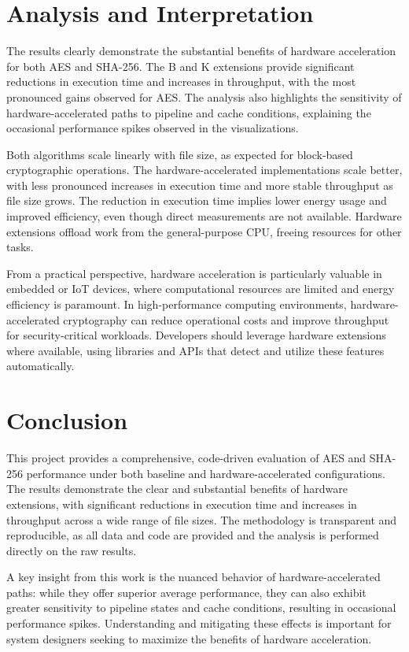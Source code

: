 \documentclass[12pt,a4paper]{article}
\begin{document}
\section{Analysis and Interpretation}
The results clearly demonstrate the substantial benefits of hardware acceleration for both AES and SHA-256. The B and K extensions provide significant reductions in execution time and increases in throughput, with the most pronounced gains observed for AES. The analysis also highlights the sensitivity of hardware-accelerated paths to pipeline and cache conditions, explaining the occasional performance spikes observed in the visualizations.

Both algorithms scale linearly with file size, as expected for block-based cryptographic operations. The hardware-accelerated implementations scale better, with less pronounced increases in execution time and more stable throughput as file size grows. The reduction in execution time implies lower energy usage and improved efficiency, even though direct measurements are not available. Hardware extensions offload work from the general-purpose CPU, freeing resources for other tasks.

From a practical perspective, hardware acceleration is particularly valuable in embedded or IoT devices, where computational resources are limited and energy efficiency is paramount. In high-performance computing environments, hardware-accelerated cryptography can reduce operational costs and improve throughput for security-critical workloads. Developers should leverage hardware extensions where available, using libraries and APIs that detect and utilize these features automatically.

\section{Conclusion}
This project provides a comprehensive, code-driven evaluation of AES and SHA-256 performance under both baseline and hardware-accelerated configurations. The results demonstrate the clear and substantial benefits of hardware extensions, with significant reductions in execution time and increases in throughput across a wide range of file sizes. The methodology is transparent and reproducible, as all data and code are provided and the analysis is performed directly on the raw results.

A key insight from this work is the nuanced behavior of hardware-accelerated paths: while they offer superior average performance, they can also exhibit greater sensitivity to pipeline states and cache conditions, resulting in occasional performance spikes. Understanding and mitigating these effects is important for system designers seeking to maximize the benefits of hardware acceleration.
\end{document}

